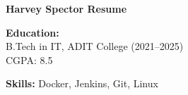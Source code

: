 \documentclass[a4paper,10pt]{article}
\begin{document}
\begin{center}
\Huge \textbf{Harvey Spector Resume}
\end{center}
\vspace{1cm}
\textbf{Education:} \\
B.Tech in IT, ADIT College (2021–2025) \\
CGPA: 8.5

\vspace{0.5cm}
\textbf{Skills:} Docker, Jenkins, Git, Linux
\end{document}
